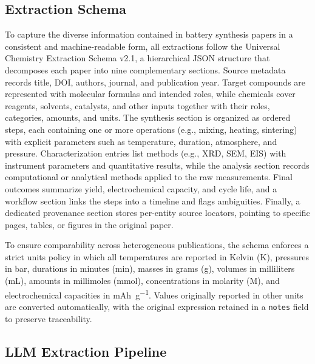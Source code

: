 \documentclass[12pt,a4paper]{article}
\begin{document}
\subsection{Extraction Schema}
\label{sec:schema}

To capture the diverse information contained in battery synthesis papers in a consistent and machine-readable form, all extractions follow the Universal Chemistry Extraction Schema v2.1, a hierarchical JSON structure that decomposes each paper into nine complementary sections. Source metadata records title, DOI, authors, journal, and publication year. Target compounds are represented with molecular formulas and intended roles, while chemicals cover reagents, solvents, catalysts, and other inputs together with their roles, categories, amounts, and units. The synthesis section is organized as ordered steps, each containing one or more operations (e.g., mixing, heating, sintering) with explicit parameters such as temperature, duration, atmosphere, and pressure. Characterization entries list methods (e.g., XRD, SEM, EIS) with instrument parameters and quantitative results, while the analysis section records computational or analytical methods applied to the raw measurements. Final outcomes summarize yield, electrochemical capacity, and cycle life, and a workflow section links the steps into a timeline and flags ambiguities. Finally, a dedicated provenance section stores per-entity source locators, pointing to specific pages, tables, or figures in the original paper.

To ensure comparability across heterogeneous publications, the schema enforces a strict units policy in which all temperatures are reported in Kelvin (K), pressures in bar, durations in minutes (min), masses in grams (g), volumes in milliliters (mL), amounts in millimoles (mmol), concentrations in molarity (M), and electrochemical capacities in \si{mAh.g^{-1}}. Values originally reported in other units are converted automatically, with the original expression retained in a \texttt{notes} field to preserve traceability.

\subsection{LLM Extraction Pipeline}
\label{sec:pipeline}
\end{document}
